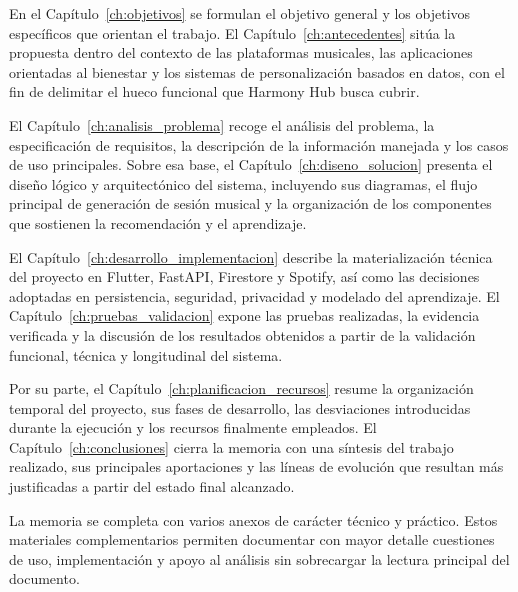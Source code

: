 En el Capítulo~\ref{ch:objetivos} se formulan el objetivo general y los objetivos específicos que orientan el trabajo. El Capítulo~\ref{ch:antecedentes} sitúa la propuesta dentro del contexto de las plataformas musicales, las aplicaciones orientadas al bienestar y los sistemas de personalización basados en datos, con el fin de delimitar el hueco funcional que Harmony Hub busca cubrir.

El Capítulo~\ref{ch:analisis_problema} recoge el análisis del problema, la especificación de requisitos, la descripción de la información manejada y los casos de uso principales. Sobre esa base, el Capítulo~\ref{ch:diseno_solucion} presenta el diseño lógico y arquitectónico del sistema, incluyendo sus diagramas, el flujo principal de generación de sesión musical y la organización de los componentes que sostienen la recomendación y el aprendizaje.

El Capítulo~\ref{ch:desarrollo_implementacion} describe la materialización técnica del proyecto en Flutter, FastAPI, Firestore y Spotify, así como las decisiones adoptadas en persistencia, seguridad, privacidad y modelado del aprendizaje. El Capítulo~\ref{ch:pruebas_validacion} expone las pruebas realizadas, la evidencia verificada y la discusión de los resultados obtenidos a partir de la validación funcional, técnica y longitudinal del sistema.

Por su parte, el Capítulo~\ref{ch:planificacion_recursos} resume la organización temporal del proyecto, sus fases de desarrollo, las desviaciones introducidas durante la ejecución y los recursos finalmente empleados. El Capítulo~\ref{ch:conclusiones} cierra la memoria con una síntesis del trabajo realizado, sus principales aportaciones y las líneas de evolución que resultan más justificadas a partir del estado final alcanzado.

La memoria se completa con varios anexos de carácter técnico y práctico. Estos materiales complementarios permiten documentar con mayor detalle cuestiones de uso, implementación y apoyo al análisis sin sobrecargar la lectura principal del documento.
